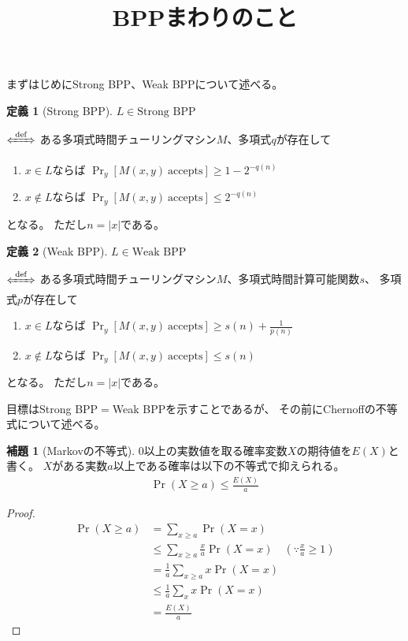 \documentclass[a4paper, 10pt]{jsarticle}
\title{BPPまわりのこと}
\author{}
\theoremstyle{definition}
\newtheorem{lem}[thm]{補題}
\newtheorem*{dfn*}{定義}
\begin{document}
\maketitle

まずはじめにStrong BPP、Weak BPPについて述べる。
\begin{screen}
\begin{dfn*}[Strong BPP]
	$L \in \textrm{Strong BPP}$

	$\xLeftrightarrow[]{\; \textrm{def} \;}$
	ある多項式時間チューリングマシン$M$、多項式$q$が存在して
	\begin{enumerate}
		\item $x \in L$ならば
			$\Pr_y \left[ M(x, y) \ \textrm{accepts} \right] \ge 1 - 2^{-q(n)}$
		\item $x \notin L$ならば
			$\Pr_y \left[ M(x, y) \ \textrm{accepts} \right] \leq 2^{-q(n)}$
	\end{enumerate}
	となる。
	ただし$n = |x|$である。
\end{dfn*}
\end{screen}

\begin{screen}
\begin{dfn*}[Weak BPP]
	$L \in \textrm{Weak BPP}$

	$\xLeftrightarrow[]{\; \textrm{def} \;}$
	ある多項式時間チューリングマシン$M$、多項式時間計算可能関数$s$、
	多項式$p$が存在して
	\begin{enumerate}
		\item $x \in L$ならば
			$\Pr_y \left[ M(x, y) \ \textrm{accepts} \right]
			\ge s(n) + \frac{1}{p(n)}$
		\item $x \notin L$ならば
			$\Pr_y \left[ M(x, y) \ \textrm{accepts} \right] \leq s(n)$
	\end{enumerate}
	となる。
	ただし$n = |x|$である。
\end{dfn*}
\end{screen}

目標はStrong BPP$=$Weak BPPを示すことであるが、
その前にChernoffの不等式について述べる。
\begin{screen}
\begin{lem}[Markovの不等式]\label{lem:Markov}
	0以上の実数値を取る確率変数$X$の期待値を$E(X)$と書く。
	$X$がある実数$a$以上である確率は以下の不等式で抑えられる。
	\begin{align}
		\Pr(X \ge a) \leq \frac{E(X)}{a}
	\end{align}
\end{lem}
\end{screen}
\begin{proof}
	\begin{align}
		\Pr (X \ge a) &= \sum_{x \ge a} \Pr (X = x) \\
		&\leq \sum_{x \ge a} \frac{x}{a} \Pr (X = x)
		\quad \left(\because \frac{x}{a} \ge 1 \right) \\
		&= \frac{1}{a} \sum_{x \ge a} x \Pr (X = x) \\
		&\le \frac{1}{a} \sum_{x} x\Pr (X = x) \\
		&= \frac{E(X)}{a}
	\end{align}
\end{proof}
\end{document}
